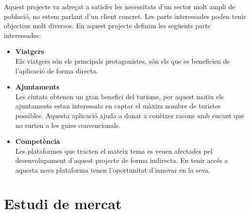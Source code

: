 Aquest projecte va adreçat a satisfer les necessitats d'un sector molt ampli de població, no estem parlant d'un client concret. Les parts interessades poden tenir objectius molt diversos. En aquest projecte definim les següents parts interessades:
\begin{itemize}

\item\textbf{Viatgers}\\
Els viatgers són els principals protagonistes, són els que es beneficien de l'aplicació de forma directa.

\item\textbf{Ajuntaments}\\
Les ciutats obtenen un gran benefici del turisme, per aquest motiu els ajuntaments estan interessats en captar el màxim nombre de turistes possibles. Aquesta aplicació ajuda a donar a conèixer racons amb encant que no surten a les guies convencionals.

\item\textbf{Competència}\\
Les plataformes que tracten el mateix tema es veuen afectades pel desenvolupament d'aquest projecte de forma indirecta. En tenir accés a aquesta nova plataforma tenen l'oportunitat d'innovar en la seva.

\end{itemize}
\section{Estudi de mercat}

